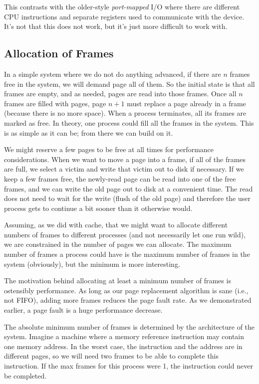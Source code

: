 This contrasts with the older-style \textit{port-mapped} I/O where there are different CPU instructions and separate registers used to communicate with the device. It's not that this does not work, but it's just more difficult to work with.

\subsection*{Allocation of Frames}
In a simple system where we do not do anything advanced, if there are $n$ frames free in the system, we will demand page all of them. So the initial state is that all frames are empty, and as needed, pages are read into those frames. Once all $n$ frames are filled with pages, page $n+1$ must replace a page already in a frame (because there is no more space). When a process terminates, all its frames are marked as free. In theory, one process could fill all the frames in the system. This is as simple as it can be; from there we can build on it.

We might reserve a few pages to be free at all times for performance considerations. When we want to move a page into a frame, if all of the frames are full, we select a victim and write that victim out to disk if necessary. If we keep a few frames free, the newly-read page can be read into one of the free frames, and we can write the old page out to disk at a convenient time. The read does not need to wait for the write (flush of the old page) and therefore the user process gets to continue a bit sooner than it otherwise would.

Assuming, as we did with cache, that we might want to allocate different numbers of frames to different processes (and not necessarily let one run wild), we are constrained in the number of pages we can allocate. The maximum number of frames a process could have is the maximum number of frames in the system (obviously), but the minimum is more interesting.

The motivation behind allocating at least a minimum number of frames is ostensibly performance. As long as our page replacement algorithm is sane (i.e., not FIFO), adding more frames reduces the page fault rate. As we demonstrated earlier, a page fault is a huge performance decrease. 

The absolute minimum number of frames is determined by the architecture of the system. Imagine a machine where a memory reference instruction may contain one memory address. In the worst case, the instruction and the address are in different pages, so we will need two frames to be able to complete this instruction. If the max frames for this process were 1, the instruction could never be completed. 

